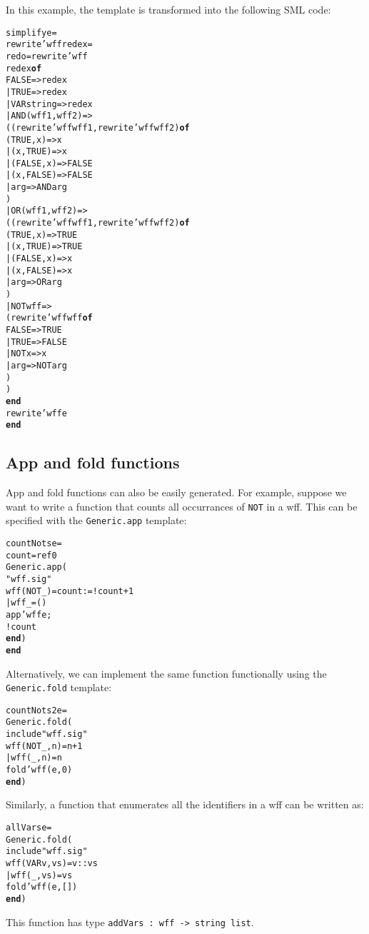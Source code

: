\documentclass{article}
\newcommand{\END}{{\bf end}}
\newcommand{\OF}{{\bf of}}
\begin{document}
In this example, the template is transformed into the following SML code:
\begin{alltt}
  \FUN simplify e = 
  \LET \FUN rewrite'wff redex = 
      \LET \VAL redo = rewrite'wff
      \IN  \CASE redex \OF
             FALSE => redex
           | TRUE => redex
           | VAR string => redex
           | AND(wff1, wff2) => 
             (\CASE (rewrite'wff wff1, rewrite'wff wff2) \OF
               (TRUE, x) => x
             | (x, TRUE) => x
             | (FALSE, x) => FALSE
             | (x, FALSE) => FALSE
             | arg => AND arg
             )
           | OR(wff1, wff2) => 
             (\CASE (rewrite'wff wff1, rewrite'wff wff2) \OF
               (TRUE, x) => TRUE
             | (x, TRUE) => TRUE
             | (FALSE, x) => x
             | (x, FALSE) => x
             | arg => OR arg
             )
           | NOT wff => 
             (\CASE rewrite'wff wff \OF
               FALSE => TRUE
             | TRUE => FALSE
             | NOT x => x
             | arg => NOT arg
             )
           )
        \END
   \IN rewrite'wff e
   \END
\end{alltt}
\subsection{App and fold functions}

 App and fold functions can also be easily generated.
For example, suppose we want to write a function that counts all occurrances
of \verb|NOT| in a wff.  This can be specified with the
\verb|Generic.app| template:
\begin{alltt}
   \FUN countNots e = 
   \LET \VAL count = ref 0
   \IN  Generic.app(
       \LET \INCLUDE "wff.sig"
           \FUN wff (NOT _) = count := !count + 1
             | wff _ = ()
       \IN  app'wff e;
           !count
       \END)
   \END 
\end{alltt}

Alternatively, we can implement the same function 
functionally using the \verb|Generic.fold| template:
\begin{alltt}
   \FUN countNots2 e = 
       Generic.fold(
       \LET include "wff.sig"
           \FUN wff (NOT _, n) = n+1
             | wff (_, n) = n
       \IN  fold'wff(e, 0)
       \END)
\end{alltt}

Similarly, a function that enumerates all the identifiers in a wff
can be written as:
\begin{alltt}
   \FUN allVars e = 
       Generic.fold(
       \LET include "wff.sig"
           \FUN wff (VAR v, vs) = v::vs
             | wff (_, vs) = vs
       \IN  fold'wff(e, [])
       \END)
\end{alltt}
This function has type \verb|addVars : wff -> string list|.
\end{document}
